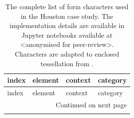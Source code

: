 \begin{longtable}{p{5cm}p{4cm}p{4cm}l}
    \caption{The complete list of form characters used in the Houston case study. The implementation details are available
    in Jupyter notebooks available at <anonymised for peer-review>.
    Characters are adapted to enclosed tessellation from \cite{fleischmann2021methodological}.}
    \label{tab:form_hou} \\
    \toprule
                                   index &                         element &                    context &     category \\
    \midrule
    \endfirsthead

    \toprule
                                   index &                         element &                    context &     category \\
    \midrule
    \endhead
    \midrule
    \multicolumn{4}{r}{{Continued on next page}} \\
    \midrule
    \endfoot


\end{longtable}
